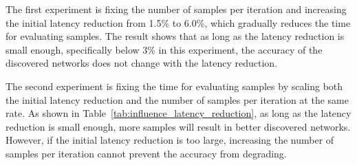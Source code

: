 The first experiment is fixing the number of samples per iteration and increasing the initial latency reduction from 1.5\% to 6.0\%, which gradually reduces the time for evaluating samples. The result shows that as long as the latency reduction is small enough, specifically below 3\% in this experiment, the accuracy of the discovered networks does not change with the latency reduction.

The second experiment is fixing the time for evaluating samples by scaling both the initial latency reduction and the number of samples per iteration at the same rate. As shown in Table~\ref{tab:influence_latency_reduction}, as long as the latency reduction is small enough, more samples will result in better discovered networks. However, if the initial latency reduction is too large, increasing the number of samples per iteration cannot prevent the accuracy from degrading.

